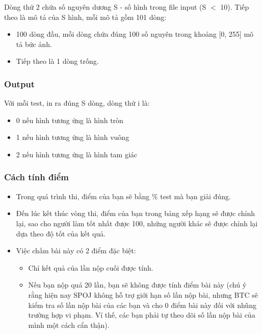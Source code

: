Dòng thứ 2 chứa số nguyên dương S - số hình trong file input (S $<$ 10). Tiếp theo là mô tả của S hình, mỗi mô tả gồm 101 dòng:
\begin{itemize}
	\item 100 dòng đầu, mỗi dòng chứa đúng 100 số nguyên trong khoảng [0, 255] mô tả bức ảnh.
	\item Tiếp theo là 1 dòng trống.
\end{itemize}

\subsubsection{Output}

Với mỗi test, in ra đúng S dòng, dòng thứ i là:
\begin{itemize}
	\item 0 nếu hình tương ứng là hình tròn
	\item 1 nếu hình tương ứng là hình vuông
	\item 2 nếu hình tương ứng là hình tam giác
\end{itemize}

\subsubsection{Cách tính điểm}
\begin{itemize}
	\item Trong quá trình thi, điểm của bạn sẽ bằng \% test mà bạn giải đúng.
	\item Đến lúc kết thúc vòng thi, điểm của bạn trong bảng xếp hạng sẽ được chỉnh lại, sao cho người làm tốt nhất được 100, những người khác sẽ được chỉnh lại dựa theo độ tốt của kết quả.
	\item Việc chấm bài này có 2 điểm đặc biệt:           

 
\begin{itemize}
	\item Chỉ kết quả của lần nộp cuối được tính.
	\item Nếu bạn nộp quá 20 lần, bạn sẽ không được tính điểm bài này (chú ý rằng hiện nay SPOJ không hỗ trợ giới hạn số lần nộp bài, nhưng BTC sẽ kiểm tra số lần nộp bài của các bạn và cho 0 điểm bài này đối với nhũng trường hợp vi phạm. Ví thế, các bạn phải tự theo dõi số lần nộp bài của mình một cách cẩn thận).
\end{itemize}
\end{itemize}

 